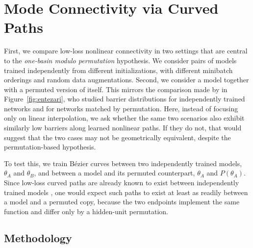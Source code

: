 \documentclass[11pt,a4paper]{report}
\begin{document}

\section{Mode Connectivity via Curved Paths}

First, we compare low-loss nonlinear connectivity in two settings that are central to the \textit{one-basin modulo permutation} hypothesis. We consider pairs of models trained independently from different initializations, with different minibatch orderings and random data augmentations. Second, we consider a model together with a permuted version of itself. This mirrors the comparison made by \citet{entezari2021role} in Figure~\ref{fig:entezari}, who studied barrier distributions for independently trained networks and for networks matched by permutation. Here, instead of focusing only on linear interpolation, we ask whether the same two scenarios also exhibit similarly low barriers along learned nonlinear paths. If they do not, that would suggest that the two cases may not be geometrically equivalent, despite the permutation-based hypothesis.

To test this, we train Bézier curves between two independently trained
models, $\theta_A$ and $\theta_B$, and between a model and its permuted
counterpart, $\theta_A$ and $P(\theta_A)$. Since low-loss curved paths are already
known to exist between independently trained models \citet{garipov2018loss}, one
would expect such paths to exist at least as readily between a model and a
permuted copy, because the two endpoints implement the same function and differ
only by a hidden-unit permutation.

\subsection{Methodology}
\end{document}

